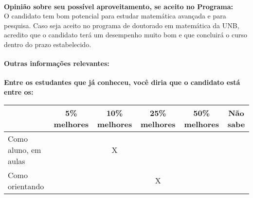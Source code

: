 \documentclass[11pt]{article}
\begin{document}
\\
\textbf{Opinião sobre seu possível aproveitamento, se aceito no Programa:}
\\O candidato tem bom potencial para estudar matemática avançada e para pesquisa. Caso seja aceito no programa de doutorado em matemática da UNB, acredito que o candidato terá um desempenho muito bom e que concluirá o curso dentro do prazo estabelecido.\\ 
\\
\textbf{Outras informações relevantes:} \\
\\[0.3cm]
\textbf{Entre os estudantes que já conheceu, você diria que o candidato está entre os:}
\\
\begin{tabular}{|l|c|c|c|c|c|}
\hline
 & 5\% melhores & 10\% melhores & 25\% melhores & 50\% melhores & Não sabe \\
\hline
Como aluno, em aulas &  & X &  &  & \\
\hline
Como orientando &  &  & X &  & \\
\hline
\end{tabular}
\end{document}
